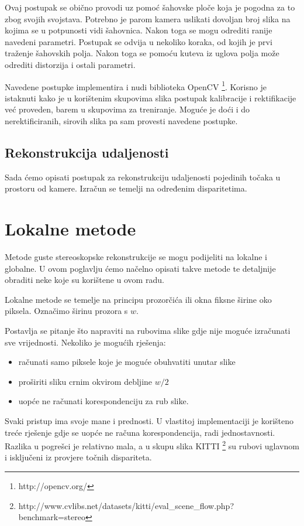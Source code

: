 \documentclass[utf8, zavrsni, numeric]{fer}
\begin{document}
Ovaj postupak se obično provodi uz pomoć šahovske ploče koja je pogodna za to zbog svojih svojstava. Potrebno je parom kamera uslikati dovoljan broj slika na kojima se u potpunosti vidi šahovnica.
Nakon toga se mogu odrediti ranije navedeni parametri. Postupak se odvija u nekoliko koraka, od kojih je prvi traženje šahovskih polja. Nakon toga se pomoću kuteva iz uglova polja može odrediti distorzija
i ostali parametri.

Navedene postupke implementira i nudi biblioteka OpenCV \footnote{http://opencv.org/}. Korisno je istaknuti kako je u korištenim skupovima slika postupak kalibracije i rektifikacije već proveden, barem u skupovima za treniranje. Moguće je doći i do nerektificiranih, sirovih slika pa sam provesti navedene postupke.


\section{Rekonstrukcija udaljenosti}
Sada ćemo opisati postupak za rekonstrukciju udaljenosti pojedinih točaka u prostoru od kamere. Izračun se temelji na određenim disparitetima.

\chapter{Lokalne metode}
Metode guste stereoskopske rekonstrukcije se mogu podijeliti na lokalne i globalne. U ovom poglavlju ćemo načelno opisati takve metode te detaljnije obraditi neke koje su korištene u ovom radu.

Lokalne metode se temelje na principu prozorčića ili okna fiksne širine oko piksela. Označimo širinu prozora s $w$.

Postavlja se pitanje što napraviti na rubovima slike gdje nije moguće izračunati sve vrijednosti. Nekoliko je mogućih rješenja:
\begin{itemize}
  \item računati samo piksele koje je moguće obuhvatiti unutar slike
  \item proširiti sliku crnim okvirom debljine $w/2$
  \item uopće ne računati korespondenciju za rub slike.
\end{itemize}

Svaki pristup ima svoje mane i prednosti. U vlastitoj implementaciji je korišteno treće rješenje gdje se uopće ne računa korespondencija, radi jednostavnosti. Razlika u pogrešci je relativno
mala, a u skupu slika KITTI \footnote{http://www.cvlibs.net/datasets/kitti/eval\_scene\_flow.php?benchmark=stereo} su rubovi uglavnom i isključeni iz provjere točnih dispariteta.
\end{document}
